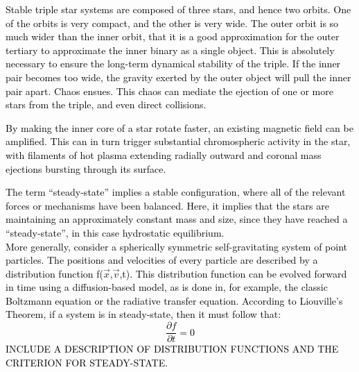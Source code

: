\documentclass[main.tex]{subfiles}
\begin{document}
\begin{tcolorbox}[sharp corners, colback=red!30, colframe=red!80!blue, title=Box \refstepcounter{educhap1}\label{boxchap1:ds}\ref{boxchap1:ds} -- Dynamical Stability]
\par \textcolor{black}{Stable triple star systems are composed of three stars, and hence two orbits.  One of the orbits is very compact, and the other is very wide.  The outer orbit is so much wider than the inner orbit, that it is a good approximation for the outer tertiary to approximate the inner binary as a single object.  This is absolutely necessary to ensure the long-term dynamical stability of the triple.  If the inner pair becomes too wide, the gravity exerted by the outer object will pull the inner pair apart.  Chaos ensues.  This chaos can mediate the ejection of one or more stars from the triple, and even direct collisions.}  
\end{tcolorbox}



\begin{tcolorbox}[sharp corners, colback=red!30, colframe=red!80!blue, title=Box \refstepcounter{educhap1}\label{boxchap1:mf}\ref{boxchap1:mf} -- Magnetic Fields and Dynamos]
\par \textcolor{black} {By making the inner core of a star rotate faster, an existing magnetic field can be amplified.   This can in turn trigger substantial chromospheric activity in the star, with filaments of hot plasma extending radially outward and coronal mass ejections bursting through its surface.}  
\end{tcolorbox}

\begin{tcolorbox}[sharp corners, colback=blue!30, colframe=blue!80!blue, title=Box \refstepcounter{educhap1}\label{boxchap1:ss}\ref{boxchap1:ss} -- Steady State]
\par \textcolor{black} {The term ``steady-state'' implies a stable configuration, where all of the relevant forces or mechanisms have been balanced.  Here, it implies that the stars are maintaining an approximately constant mass and size, since they have reached a ``steady-state'', in this case hydrostatic equilibrium. \\
More generally, consider a spherically symmetric self-gravitating system of point particles.  The positions and velocities of every particle are described by a distribution function f($\vec{x}$,$\vec{v}$,t).  This distribution function can be evolved forward in time using a diffusion-based model, as is done in, for example, the classic Boltzmann equation or the radiative transfer equation.  According to Liouville's Theorem, if a system is in steady-state, then it must follow that:
\begin{equation}
\label{eqn:steadystate}
\frac{{\partial}f}{{\partial}t} = 0
\end{equation}
INCLUDE A DESCRIPTION OF DISTRIBUTION FUNCTIONS AND THE CRITERION FOR STEADY-STATE.} 
\end{tcolorbox}
\end{document}
